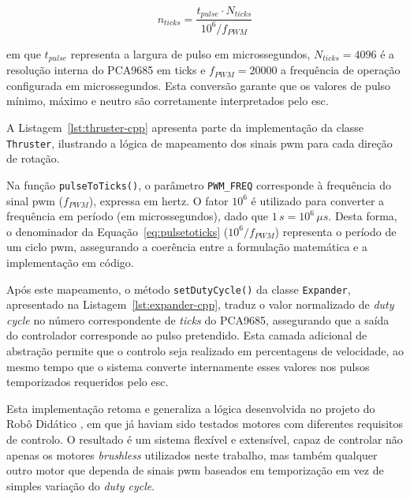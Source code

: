 \begin{equation}
n_{ticks} = \frac{t_{pulse} \cdot N_{ticks}}{10^6 / f_{PWM}}
\label{eq:pulsetoticks}
\end{equation}

em que \(t_{pulse}\) representa a largura de pulso em microssegundos, \(N_{ticks} = 4096\) é a resolução interna do PCA9685 em ticks e \(f_{PWM} = 20000\) a frequência de operação configurada em microssegundos. Esta conversão garante que os valores de pulso mínimo, máximo e neutro são corretamente interpretados pelo \gls{esc}.  

A Listagem~\ref{lst:thruster-cpp} apresenta parte da implementação da classe \texttt{Thruster}, ilustrando a lógica de mapeamento dos sinais \gls{pwm} para cada direção de rotação.  



Na função \texttt{pulseToTicks()}, o parâmetro \texttt{PWM\_FREQ} corresponde à frequência do sinal \gls{pwm} (\(f_{PWM}\)), expressa em hertz.  O fator \(10^6\) é utilizado para converter a frequência em período (em microssegundos), dado que \(1 \, s = 10^6 \, \mu s\). Desta forma, o denominador da Equação~\ref{eq:pulsetoticks} (\(10^6/f_{PWM}\)) representa o período de um ciclo \gls{pwm}, assegurando a coerência entre a formulação matemática e a implementação em código.

Após este mapeamento, o método \texttt{setDutyCycle()} da classe \texttt{Expander}, apresentado na Listagem~\ref{lst:expander-cpp}, traduz o valor normalizado de \emph{duty cycle} no número correspondente de \emph{ticks} do PCA9685, assegurando que a saída do controlador corresponde ao pulso pretendido. Esta camada adicional de abstração permite que o controlo seja realizado em percentagens de velocidade, ao mesmo tempo que o sistema converte internamente esses valores nos pulsos temporizados requeridos pelo \gls{esc}.  



Esta implementação retoma e generaliza a lógica desenvolvida no projeto do Robô Didático \cite{didactic-robot-thesis}, em que já haviam sido testados motores com diferentes requisitos de controlo. O resultado é um sistema flexível e extensível, capaz de controlar não apenas os motores \emph{brushless} utilizados neste trabalho, mas também qualquer outro motor que dependa de sinais \gls{pwm} baseados em temporização em vez de simples variação do \emph{duty cycle}.

